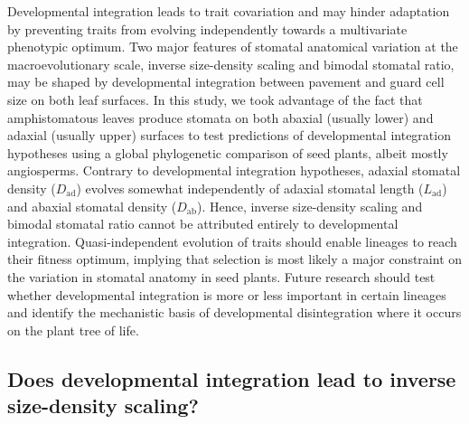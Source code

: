 \documentclass[
  10pt,
]{article}
\begin{document}
Developmental integration leads to trait covariation and may hinder adaptation by preventing traits from evolving independently towards a multivariate phenotypic optimum. Two major features of stomatal anatomical variation at the macroevolutionary scale, inverse size-density scaling and bimodal stomatal ratio, may be shaped by developmental integration between pavement and guard cell size on both leaf surfaces. In this study, we took advantage of the fact that amphistomatous leaves produce stomata on both abaxial (usually lower) and adaxial (usually upper) surfaces to test predictions of developmental integration hypotheses using a global phylogenetic comparison of seed plants, albeit mostly angiosperms. Contrary to developmental integration hypotheses, adaxial stomatal density (\(D_\text{ad}\)) evolves somewhat independently of adaxial stomatal length (\(L_\text{ad}\)) and abaxial stomatal density (\(D_\text{ab}\)). Hence, inverse size-density scaling and bimodal stomatal ratio cannot be attributed entirely to developmental integration. Quasi-independent evolution of traits should enable lineages to reach their fitness optimum, implying that selection is most likely a major constraint on the variation in stomatal anatomy in seed plants. Future research should test whether developmental integration is more or less important in certain lineages and identify the mechanistic basis of developmental disintegration where it occurs on the plant tree of life.

\hypertarget{does-developmental-integration-lead-to-inverse-size-density-scaling}{%
\subsection{Does developmental integration lead to inverse size-density scaling?}\label{does-developmental-integration-lead-to-inverse-size-density-scaling}}
\end{document}
